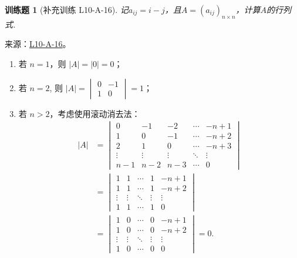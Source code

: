 \documentclass[UTF8,12pt,a4paper,fontset=fandol]{ctexart}
\newtheorem{exercise}{训练题}[section]
\begin{document}
\begin{exercise}[补充训练 L10-A-16]\label{prob:L10-A-16}
记$a_{ij}=i-j$，且$A=(a_{ij})_{n\times n}$，计算$A$的行列式.
\end{exercise}
\noindent 来源：\href{https://github.com/yhwu-is/Linear-Algebra-Left-Undone/blob/new/%E8%AE%B2%E4%B9%89/%E4%B8%93%E9%A2%98/10%20%E8%A1%8C%E5%88%97%E5%BC%8F.tex}{L10-A-16}。
\begin{solve}
\begin{enumerate}
                \item 若 $n=1$，则 $|A| = |0| = 0$；

                \item 若 $n=2$, 则 $|A| = \begin{vmatrix} 0 & -1 \\ 1 & 0 \end{vmatrix} = 1$；

                \item 若 $n>2$，考虑使用滚动消去法：
                    \begin{align*}
                        |A| &= \begin{vmatrix}
                            0      & -1     & -2     & \cdots & -n+1   \\
                            1      & 0      & -1     & \cdots & -n+2   \\
                            2      & 1      & 0      & \cdots & -n+3   \\
                            \vdots & \vdots & \vdots & \ddots & \vdots \\
                            n-1    & n-2    & n-3    & \cdots & 0
                        \end{vmatrix} \\
                        &= \begin{vmatrix}
                            1 & 1 & \cdots & 1 & -n+1 \\
                            1 & 1 & \cdots & 1 & -n+2 \\
                            \vdots & \vdots & \ddots & \vdots & \vdots \\
                            1 & 1 & \cdots & 1 & 0
                        \end{vmatrix} \\
                        &= \begin{vmatrix}
                            1 & 0 & \cdots & 0 & -n+1 \\
                            1 & 0 & \cdots & 0 & -n+2 \\
                            \vdots & \vdots & \ddots & \vdots & \vdots \\
                            1 & 0 & \cdots & 0 & 0
                        \end{vmatrix}
                        = 0.
                    \end{align*}
            \end{enumerate}
\end{solve}
\end{document}
